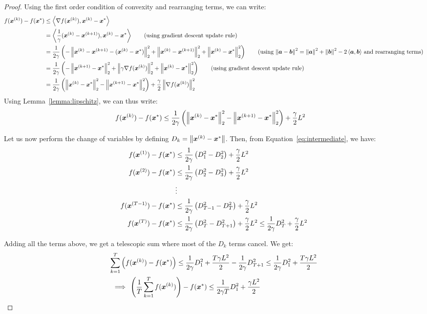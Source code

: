\documentclass{article}
\begin{document}
\begin{proof}
Using the first order condition of convexity and rearranging terms, we can write:
\begin{align*}
    f(\vx^{(k)})-f(\vx^\ast) &\leq \inner{\nabla f(\vx^{(k)}), \vx^{(k)}-\vx^\ast} \\
    &= \inner{\frac{1}{\gamma}(\vx^{(k)}-\vx^{(k+1)}), \vx^{(k)}-\vx^\ast} \tag{using gradient descent update rule} \\
    &= \frac{1}{2\gamma} \parens{-\norm{\vx^{(k)}-\vx^{(k+1)}-(\vx^{(k)}-\vx^\ast)}_2^2 + \norm{\vx^{(k)}-\vx^{(k+1)}}_2^2 + \norm{\vx^{(k)}-\vx^\ast}_2^2} \tag{using $\norm{\va-\vb}^2 = \norm{\va}^2 + \norm{\vb}^2 - 2\inner{\va,\vb}$ and rearranging terms} \\
    &= \frac{1}{2\gamma} \parens{-\norm{\vx^{(k+1)}-\vx^\ast}_2^2 + \norm{\gamma\nabla f(\vx^{(k)})}_2^2 + \norm{\vx^{(k)}-\vx^\ast}_2^2} \tag{using gradient descent update rule}\\
    &= \frac{1}{2\gamma} \parens{\norm{\vx^{(k)} - \vx^\ast}_2^2 - \norm{\vx^{(k+1)} - \vx^\ast}_2^2} + \frac{\gamma}{2}\norm{\nabla f(\vx^{(k)})}_2^2
\end{align*}
Using Lemma~\ref{lemma:lipschitz}, we can thus write:
\begin{align}
    f({\bm{x}}^{(k)})-f({\bm{x}}^\ast) &\leq \frac{1}{2\gamma} \left(\left\|{\bm{x}}^{(k)} - {\bm{x}}^\ast\right\|_2^2 - \left\|{\bm{x}}^{(k+1)} - {\bm{x}}^\ast\right\|_2^2\right) + \frac{\gamma}{2}L^2 \label{eq:intermediate}
\end{align}

Let us now perform the change of variables by defining $D_k = \left\|{\bm{x}}^{(k)}-{\bm{x}}^\ast\right\|$. Then, from Equation~\ref{eq:intermediate}, we have:
\begin{align*}
f({\bm{x}}^{(1)}) - f({\bm{x}}^\ast) &\leq \frac{1}{2\gamma} \left(D_1^2 - D_2^2\right) + \frac{\gamma}{2}L^2\\
f({\bm{x}}^{(2)}) - f({\bm{x}}^\ast) &\leq \frac{1}{2\gamma} \left(D_2^2 - D_3^2\right) + \frac{\gamma}{2}L^2\\
&\vdots\\
f({\bm{x}}^{(T-1)}) - f({\bm{x}}^\ast) &\leq \frac{1}{2\gamma} \left(D_{T-1}^2 - D_T^2\right) + \frac{\gamma}{2}L^2\\
f({\bm{x}}^{(T)}) - f({\bm{x}}^\ast) &\leq \frac{1}{2\gamma} \left(D_T^2 - D_{T+1}^2\right) + \frac{\gamma}{2}L^2 \leq \frac{1}{2\gamma} D_T^2 + \frac{\gamma}{2}L^2
\end{align*}

Adding all the terms above, we get a telescopic sum where most of the $D_k$ terms cancel. We get:
\begin{multline}
\sum_{k=1}^T \left(f({\bm{x}}^{(k)})-f({\bm{x}}^\ast)\right) \leq 
\frac{1}{2\gamma} D_1^2 + \frac{T\gamma L^2}{2}
-
\frac{1}{2\gamma} D_{T + 1}^2 
\leq 
\frac{1}{2\gamma} D_1^2 + \frac{T\gamma L^2}{2}
\\
\implies {} 
\left(\frac{1}{T}\sum_{k=1}^T f({\bm{x}}^{(k)})\right)-f({\bm{x}}^\ast) \leq \frac{1}{2\gamma T} D_1^2 + \frac{\gamma L^2}{2}
\qquad\qquad\qquad\qquad
\label{eq:intermediate2}
\end{multline}


\end{proof}
\end{document}
